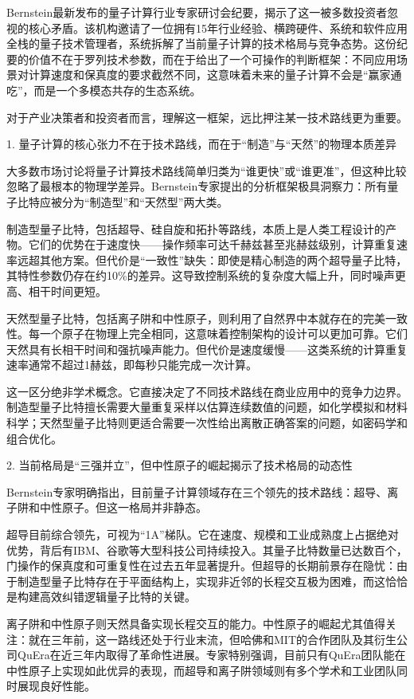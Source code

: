 \documentclass[11pt]{ctexart}
\begin{document}
Bernstein最新发布的量子计算行业专家研讨会纪要，揭示了这一被多数投资者忽视的核心矛盾。该机构邀请了一位拥有15年行业经验、横跨硬件、系统和软件应用全栈的量子技术管理者，系统拆解了当前量子计算的技术格局与竞争态势。这份纪要的价值不在于罗列技术参数，而在于给出了一个可操作的判断框架：不同应用场景对计算速度和保真度的要求截然不同，这意味着未来的量子计算不会是“赢家通吃”，而是一个多模态共存的生态系统。

对于产业决策者和投资者而言，理解这一框架，远比押注某一技术路线更为重要。

1. 量子计算的核心张力不在于技术路线，而在于“制造”与“天然”的物理本质差异

大多数市场讨论将量子计算技术路线简单归类为“谁更快”或“谁更准”，但这种比较忽略了最根本的物理学差异。Bernstein专家提出的分析框架极具洞察力：所有量子比特应被分为“制造型”和“天然型”两大类。

制造型量子比特，包括超导、硅自旋和拓扑等路线，本质上是人类工程设计的产物。它们的优势在于速度快——操作频率可达千赫兹甚至兆赫兹级别，计算重复速率远超其他方案。但代价是“一致性”缺失：即使是精心制造的两个超导量子比特，其特性参数仍存在约10\%的差异。这导致控制系统的复杂度大幅上升，同时噪声更高、相干时间更短。

天然型量子比特，包括离子阱和中性原子，则利用了自然界中本就存在的完美一致性。每一个原子在物理上完全相同，这意味着控制架构的设计可以更加可靠。它们天然具有长相干时间和强抗噪声能力。但代价是速度缓慢——这类系统的计算重复速率通常不超过1赫兹，即每秒只能完成一次计算。

这一区分绝非学术概念。它直接决定了不同技术路线在商业应用中的竞争力边界。制造型量子比特擅长需要大量重复采样以估算连续数值的问题，如化学模拟和材料科学；天然型量子比特则更适合需要一次性给出离散正确答案的问题，如密码学和组合优化。

2. 当前格局是“三强并立”，但中性原子的崛起揭示了技术格局的动态性

Bernstein专家明确指出，目前量子计算领域存在三个领先的技术路线：超导、离子阱和中性原子。但这一格局并非静态。

超导目前综合领先，可视为“1A”梯队。它在速度、规模和工业成熟度上占据绝对优势，背后有IBM、谷歌等大型科技公司持续投入。其量子比特数量已达数百个，门操作的保真度和可重复性在过去五年显著提升。但超导的长期前景存在隐忧：由于制造型量子比特存在于平面结构上，实现非近邻的长程交互极为困难，而这恰恰是构建高效纠错逻辑量子比特的关键。

离子阱和中性原子则天然具备实现长程交互的能力。中性原子的崛起尤其值得关注：就在三年前，这一路线还处于行业末流，但哈佛和MIT的合作团队及其衍生公司QuEra在近三年内取得了革命性进展。专家特别强调，目前只有QuEra团队能在中性原子上实现如此优异的表现，而超导和离子阱领域则有多个学术和工业团队同时展现良好性能。
\end{document}
